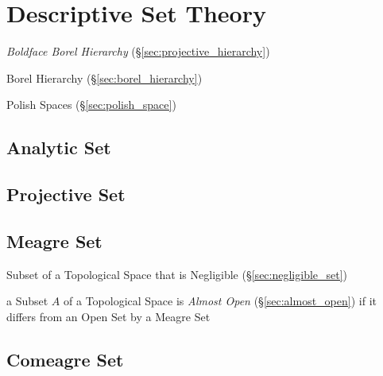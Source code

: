 \section{Descriptive Set Theory}\label{sec:descriptive_set_theory}

\emph{Boldface Borel Hierarchy} (\S\ref{sec:projective_hierarchy})

Borel Hierarchy (\S\ref{sec:borel_hierarchy})

Polish Spaces (\S\ref{sec:polish_space})



\subsection{Analytic Set}\label{sec:analytic_set}

\subsection{Projective Set}\label{sec:projective_set}

\subsection{Meagre Set}\label{sec:meagre_set}

Subset of a Topological Space that is Negligible (\S\ref{sec:negligible_set})

a Subset $A$ of a Topological Space is \emph{Almost Open}
(\S\ref{sec:almost_open}) if it differs from an Open Set by a Meagre Set



\subsection{Comeagre Set}\label{sec:comeagre_set}

